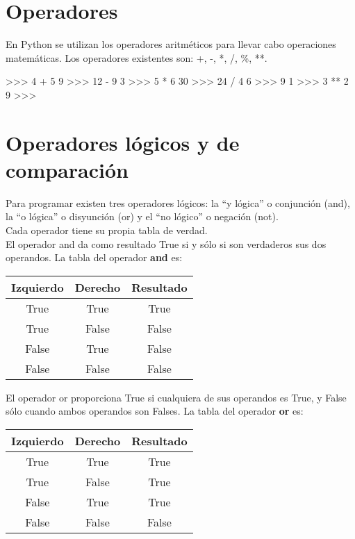 \section{Operadores}

En Python se utilizan los operadores aritméticos para llevar cabo operaciones matemáticas. Los operadores existentes son: +, -, *, /, \%, **.

\begin{pyglist} [language=python]
>>> 4 + 5
9
>>> 12 - 9
3
>>> 5 * 6
30
>>> 24 / 4
6
>>> 9 %
1
>>> 3 ** 2
9
>>>
\end{pyglist}

\section{Operadores lógicos y de comparación}

Para programar existen tres operadores lógicos: la ``y lógica'' o conjunción (and), la ``o lógica'' o disyunción (or) y el ``no lógico'' o negación (not).\\

Cada operador tiene su propia tabla de verdad.\\

El operador and da como resultado True si y sólo si son verdaderos sus dos operandos. La tabla del operador \textbf{and} es:\\

\begin{table}[h]
\centering
\begin{tabular}{|c|c|c|} \hline
Izquierdo    & Derecho & Resultado   \\ \hline
True         & True    &   True      \\ \hline
True         & False   &   False     \\ \hline
False        & True    &   False     \\ \hline
False        & False   &   False     \\ \hline
\end{tabular}
\end{table}

El operador or proporciona True si cualquiera de sus operandos es True, y False sólo cuando ambos operandos son Falses. La tabla del operador \textbf{or} es:\\

\begin{table}[h]
\centering
\begin{tabular}{|c|c|c|} \hline
Izquierdo    & Derecho & Resultado     \\ \hline
True         & True    &   True      \\ \hline
True         & False   &   True      \\ \hline
False         & True   &   True     \\ \hline
False         & False  &   False     \\ \hline       
\end{tabular}
\end{table}

